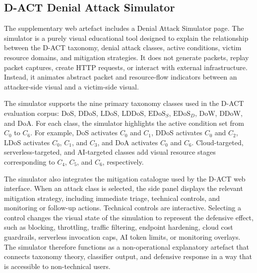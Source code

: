 \subsection{D-ACT Denial Attack Simulator}
\label{app:dact_denial_attack_simulator}

The supplementary web artefact includes a Denial Attack Simulator page. The simulator is a purely visual educational tool designed to explain the relationship between the D-ACT taxonomy, denial attack classes, active conditions, victim resource domains, and mitigation strategies. It does not generate packets, replay packet captures, create HTTP requests, or interact with external infrastructure. Instead, it animates abstract packet and resource-flow indicators between an attacker-side visual and a victim-side visual.

The simulator supports the nine primary taxonomy classes used in the D-ACT evaluation corpus: DoS, DDoS, LDoS, LDDoS, \(\text{EDoS}_{S}\), \(\text{EDoS}_{D}\), DoW, DDoW, and DoA. For each class, the simulator highlights the active condition set from \(C_0\) to \(C_6\). For example, DoS activates \(C_0\) and \(C_1\), DDoS activates \(C_0\) and \(C_2\), LDoS activates \(C_0\), \(C_1\), and \(C_3\), and DoA activates \(C_0\) and \(C_6\). Cloud-targeted, serverless-targeted, and AI-targeted classes add visual resource stages corresponding to \(C_4\), \(C_5\), and \(C_6\), respectively.

The simulator also integrates the mitigation catalogue used by the D-ACT web interface. When an attack class is selected, the side panel displays the relevant mitigation strategy, including immediate triage, technical controls, and monitoring or follow-up actions. Technical controls are interactive. Selecting a control changes the visual state of the simulation to represent the defensive effect, such as blocking, throttling, traffic filtering, endpoint hardening, cloud cost guardrails, serverless invocation caps, AI token limits, or monitoring overlays. The simulator therefore functions as a non-operational explanatory artefact that connects taxonomy theory, classifier output, and defensive response in a way that is accessible to non-technical users.
